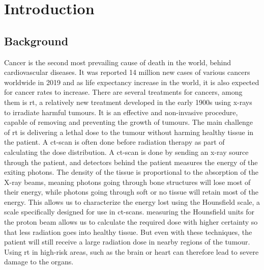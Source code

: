 \documentclass[main.tex]{subfiles}
\begin{document}
\section{Introduction}

\subsection{Background}

Cancer is the second most prevailing cause of death in the world, behind cardiovascular diseases. It was reported 14 million new cases of various cancers worldwide in 2019 \cite{porcine_2021} and as life expectancy increase in the world, it is also expected for cancer rates to increase. There are several treatments for cancers, among them is \gls{rt}, a relatively new treatment developed in the early 1900s using x-rays to irradiate harmful tumours. It is an effective and non-invasive procedure, capable of removing and preventing the growth of tumours. The main challenge of \gls{rt} is delivering a lethal dose to the tumour without harming healthy tissue in the patient. A \gls{ct}-scan is often done before radiation therapy as part of calculating the dose distribution. A \gls{ct}-scan is done by sending an x-ray source through the patient, and detectors behind the patient measures the energy of the exiting photons. The density of the tissue is proportional to the absorption of the X-ray beams, meaning photons going through bone structures will lose most of their energy, while photons going through soft or no tissue will retain most of the energy. This allows us to characterize the energy lost using the Hounsfield scale, a scale specifically designed for use in \gls{ct}-scans. measuring the Hounsfield units for the proton beam allows us to calculate the required dose with higher certainty so that less radiation goes into healthy tissue. But even with these techniques, the patient will still receive a large radiation dose in nearby regions of the tumour. Using \gls{rt} in high-risk areas, such as the brain or heart can therefore lead to severe damage to the organs.  \par
\end{document}
